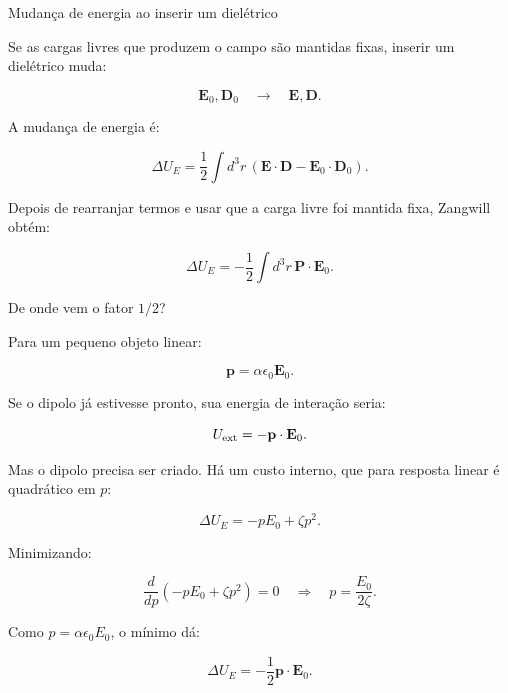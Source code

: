 \documentclass[aspectratio=169]{beamer}
\begin{document}
\begin{frame}{Mudança de energia ao inserir um dielétrico}

\small

Se as cargas livres que produzem o campo são mantidas fixas, inserir um dielétrico
muda:

\[
\mathbf E_0,\mathbf D_0
\quad \longrightarrow \quad
\mathbf E,\mathbf D.
\]

A mudança de energia é:

\[
\Delta U_E
=
\frac{1}{2}
\int d^3r\,
\left(
\mathbf E\cdot\mathbf D
-
\mathbf E_0\cdot\mathbf D_0
\right).
\]

Depois de rearranjar termos e usar que a carga livre foi mantida fixa, Zangwill
obtém:

\begin{eqbox}
\begin{equation}
\Delta U_E
=
-\frac{1}{2}
\int d^3r\,\mathbf P\cdot\mathbf E_0.
\tag{6.101}
\label{eq:energia-insercao-dieletrico}
\end{equation}
\end{eqbox}

\end{frame}

\begin{frame}{De onde vem o fator \(1/2\)?}

\footnotesize

Para um pequeno objeto linear:

\[
\mathbf p=\alpha\epsilon_0\mathbf E_0.
\]

Se o dipolo já estivesse pronto, sua energia de interação seria:

\[
U_{\rm ext}=-\mathbf p\cdot\mathbf E_0.
\]

Mas o dipolo precisa ser criado. Há um custo interno, que para resposta linear é
quadrático em \(p\):

\[
\Delta U_E=-pE_0+\zeta p^2.
\]

Minimizando:

\[
\frac{d}{dp}(-pE_0+\zeta p^2)=0
\quad\Rightarrow\quad
p=\frac{E_0}{2\zeta}.
\]

Como \(p=\alpha\epsilon_0E_0\), o mínimo dá:

\begin{eqbox}
\[
\Delta U_E=-\frac{1}{2}\mathbf p\cdot\mathbf E_0.
\]
\end{eqbox}

\end{frame}
\end{document}
